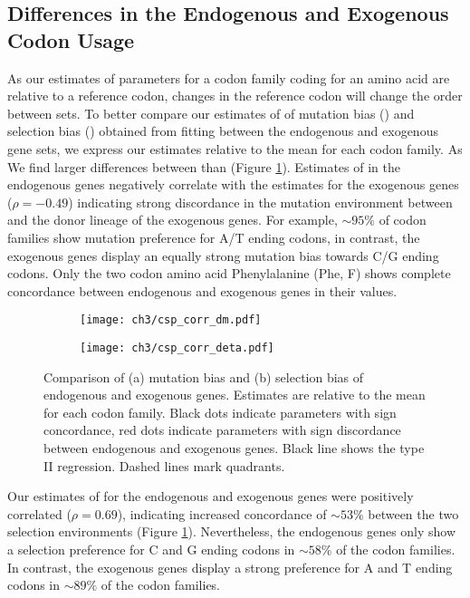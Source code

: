 \subsection{Differences in the Endogenous and Exogenous Codon Usage}

As our estimates of parameters for a codon family coding for an amino acid are relative to a reference codon, changes in the reference codon will change the order between sets.
To better compare our estimates of of mutation bias (\DM) and selection bias (\DE) obtained from fitting \ROC between the endogenous and exogenous gene sets, we express our estimates relative to the mean for each codon family.
As 
We find larger differences between \DM than \DE (Figure \ref{fig:csp_comp}). 
Estimates of \DM in the endogenous genes negatively correlate with the \DM estimates for the exogenous genes ($\rho = -0.49$) indicating strong discordance in the mutation environment between \kluyveri and the donor lineage of the exogenous genes.
For example, $\sim 95 \%$ of codon families show mutation preference for A/T ending codons, in contrast, the exogenous genes display an equally strong mutation bias towards C/G ending codons.
Only the two codon amino acid Phenylalanine (Phe, F) shows complete concordance between endogenous and exogenous genes in their \DM values.
\begin{figure}[h]
    \centering
    \begin{subfigure}
        \centering
        \texttt{[image: ch3/csp\_corr\_dm.pdf]}
    \end{subfigure}
    \begin{subfigure}
        \centering
        \texttt{[image: ch3/csp\_corr\_deta.pdf]}
    \end{subfigure}
    \caption{Comparison of (a) mutation bias \DM and (b) selection bias \DE of endogenous and exogenous genes. Estimates are relative to the mean for each codon family. Black dots indicate parameters with sign concordance, red dots indicate parameters with sign discordance between endogenous and exogenous genes. Black line shows the type II regression. Dashed lines mark quadrants.}
    \label{fig:csp_comp}
\end{figure}

Our estimates of \DE for the endogenous and exogenous genes were positively correlated ($\rho = 0.69$), indicating increased concordance of $\sim53\%$ between the two selection environments  (Figure \ref{fig:csp_comp}).
Nevertheless, the endogenous genes only show a selection preference for C and G ending codons in $\sim58\%$ of the codon families.
In contrast, the exogenous genes display a strong preference for A and T ending codons in $\sim89\%$ of the codon families.

